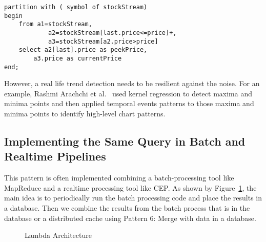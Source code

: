 \documentclass{sig-alternate}
\begin{document}
{\begin{lstlisting}[mathescape, showstringspaces=false]
partition with ( symbol of stockStream)
begin 
    from a1=stockStream, 
            a2=stockStream[last.price<=price]+,
            a3=stockStream[a2.price>price]
    select a2[last].price as peekPrice, 
    	a3.price as currentPrice
end;
\end{lstlisting} 

However, a real life trend detection needs to be resilient against the noise. For an example, Rashmi Arachchi et al.~\cite{chartPatterns} used kernel regression to detect maxima and minima points and then applied temporal events patterns to those maxima and minima points to identify high-level chart patterns. 

\subsection{Implementing the Same Query in Batch and Realtime Pipelines}

This pattern is often implemented combining a batch-processing tool like MapReduce and a realtime processing tool like CEP. As shown by Figure~\ref{fig:q3}, the main idea is to periodically run the batch processing code and place the results in a database. Then we combine the results from the batch process that is in the database or a distributed cache using Pattern 6: Merge with data in a database. 

\begin{figure}[!htbp]
\centering
{}
\caption{Lambda Architecture}
\label{fig:q3}
\end{figure}






}
\end{document}
